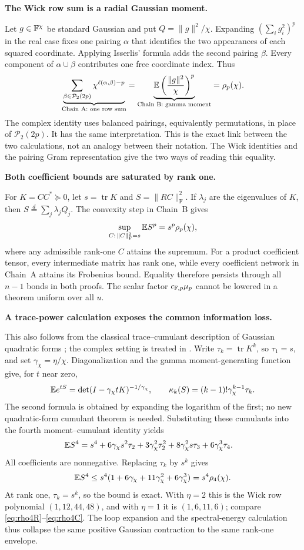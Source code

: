 \documentclass[11pt]{article}
\numberwithin{equation}{section}
\theoremstyle{definition}\newtheorem{definition}[theorem]{Definition}
\theoremstyle{remark}\newtheorem{remark}[theorem]{Remark}
\newcommand{\tr}{\operatorname{tr}}\newcommand{\Ent}{\operatorname{Ent}}
\newcommand{\norm}[1]{\lVert#1\rVert}\newcommand{\ip}[2]{\langle#1,#2\rangle}
\newcommand{\step}[1]{\par\addvspace{.65\baselineskip}\Needspace{4\baselineskip}\noindent\textbf{#1}\par\nobreak\smallskip}
\begin{document}
\step{The Wick row sum is a radial Gaussian moment.}
Let $g\in\mathbb F^\chi$ be standard Gaussian and put $Q=\norm g^2/\chi$.
Expanding $(\sum_i g_i^2)^p$ in the real case fixes one pairing $\alpha$ that
identifies the two appearances of each squared coordinate. Applying Isserlis'
formula adds the second pairing $\beta$. Every component of
$\alpha\cup\beta$ contributes one free coordinate index. Thus
\[
 \underbrace{\sum_{\beta\in\mathcal P_2(2p)}
                  \chi^{\ell(\alpha,\beta)-p}}_{\text{Chain A: one row sum}}
 =\underbrace{\E\left(\frac{\norm g^2}{\chi}\right)^p}_{\text{Chain B: gamma moment}}
 =\rho_p(\chi).
\]
The complex identity uses balanced pairings, equivalently permutations, in
place of $\mathcal P_2(2p)$. It has the same interpretation. This is the exact
link between the two calculations, not an analogy between their notation.
The Wick identities \cite{Isserlis,Goodman} and the pairing Gram representation
\cite{CollinsMatsumoto} give the two ways of reading this equality.

\step{Both coefficient bounds are saturated by rank one.}
For $K=CC^*\succeq0$, let $s=\tr K$ and $S=\norm{RC}_{\mathrm F}^2$.
If $\lambda_j$ are the eigenvalues of $K$, then
$S\stackrel d=\sum_j\lambda_jQ_j$. The convexity step in Chain~B gives
\[
 \sup_{C:\,\norm C_{\mathrm F}^2=s}\E S^p
       =s^p\rho_p(\chi),
\]
where any admissible rank-one $C$ attains the supremum. For a product coefficient
tensor, every intermediate matrix has rank one, while every coefficient
network in Chain~A attains its Frobenius bound. Equality therefore persists
through all $n-1$ bonds in both proofs. The scalar factor
$c_{\mathbb F,p}\mu_p$ cannot be lowered in a theorem uniform over all $u$.

\step{A trace-power calculation exposes the common information loss.}
This also follows from the classical trace--cumulant description of Gaussian
quadratic forms \cite{Lancaster}; the complex setting is treated in
\cite{Goodman}. Write $\tau_k=\tr K^k$, so $\tau_1=s$, and set
$\gamma_\chi=\eta/\chi$. Diagonalization and the gamma moment-generating
function give, for $t$ near zero,
\[
 \mathbb E e^{tS}=\det(I-\gamma_\chi tK)^{-1/\gamma_\chi},
 \qquad
 \kappa_k(S)=(k-1)!\gamma_\chi^{k-1}\tau_k.
\]
The second formula is obtained by expanding the logarithm of the first; no new
quadratic-form cumulant theorem is needed. Substituting these cumulants into
the fourth moment--cumulant identity \cite[Chapter~2]{McCullagh} yields
\[
 \begin{aligned}
 \mathbb E S^4={}&s^4+6\gamma_\chi s^2\tau_2
     +3\gamma_\chi^2\tau_2^2
     +8\gamma_\chi^2s\tau_3+6\gamma_\chi^3\tau_4.
 \end{aligned}
\]
All coefficients are nonnegative. Replacing $\tau_k$ by $s^k$ gives
\[
 \mathbb E S^4\le s^4(1+6\gamma_\chi+11\gamma_\chi^2+6\gamma_\chi^3)
       =s^4\rho_4(\chi).
\]
At rank one, $\tau_k=s^k$, so the bound is exact. With $\eta=2$ this is the
Wick row polynomial $(1,12,44,48)$, and with $\eta=1$ it is
$(1,6,11,6)$; compare \eqref{eq:rho4R}--\eqref{eq:rho4C}.
The loop expansion and the spectral-energy calculation thus collapse the same
positive Gaussian contraction to the same rank-one envelope.
\end{document}

